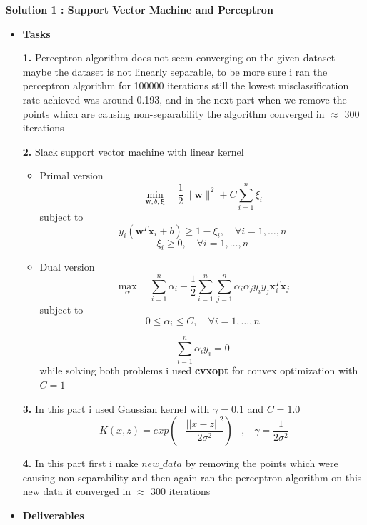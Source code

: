 \documentclass{article}
\begin{document}
    \newpage
\noindent    \textbf{Solution 1 : Support Vector Machine and Perceptron}
\begin{itemize}
    \item \textbf{Tasks}
    
    \textbf{1.} Perceptron algorithm does not seem converging on the given dataset maybe the dataset is not linearly separable, to be more sure i ran the perceptron algorithm for 100000 iterations still the lowest misclassification rate achieved was around 0.193, and in the next part when we remove the points which are causing non-separability the algorithm converged in $\approx$ 300 iterations

    \textbf{2.} Slack support vector machine with linear kernel
    \begin{itemize}
        \item Primal version
        \[
        \min_{\mathbf{w}, b, \boldsymbol{\xi}} \quad \frac{1}{2} \|\mathbf{w}\|^2 + C \sum_{i=1}^{n} \xi_i
        \]
        \hspace{60pt} subject to
        \[
        y_i (\mathbf{w}^T \mathbf{x}_i + b) \geq 1 - \xi_i, \quad \forall i = 1, \dots, n
        \]
        \[
        \xi_i \geq 0, \quad \forall i = 1, \dots, n
        \]
        \item Dual version
        \[
        \max_{\boldsymbol{\alpha}} \quad \sum_{i=1}^{n} \alpha_i - \frac{1}{2} \sum_{i=1}^{n} \sum_{j=1}^{n} \alpha_i \alpha_j y_i y_j \mathbf{x}_i^T \mathbf{x}_j
        \]
        \hspace{60pt} subject to
        \[
        0 \leq \alpha_i \leq C, \quad \forall i = 1, \dots, n
        \]

        \[
        \sum_{i=1}^{n} \alpha_i y_i = 0
        \]
        while solving both problems i used \textbf{cvxopt} for convex optimization with $C=1$ 
    \end{itemize}
        \textbf{3.} In this part i used Gaussian kernel with $\gamma = 0.1$ and $C=1.0$
        \[K(x,z) = exp\left(- \frac{|| x-z ||^2}{2 \sigma ^ 2} \right) \hspace{10pt},\hspace{10pt} \gamma = \frac{1}{2\sigma^2}\]

        \textbf{4.} In this part first i make $new\_data$ by removing the points which were causing non-separability and then again ran the perceptron algorithm on this new data it converged in $\approx$ 300 iterations
    \item \textbf{Deliverables}
    

\end{itemize}
\end{document}
